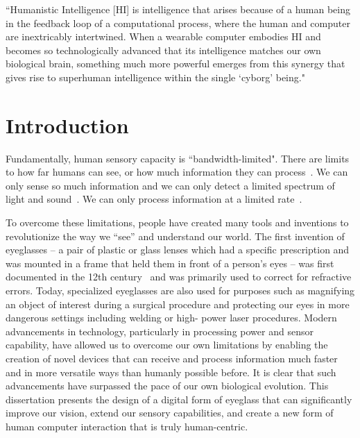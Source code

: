 \begin{savequote}[65mm]
``Humanistic Intelligence [HI] is intelligence that arises because of a human being in the feedback 
loop of a computational process, where the human and computer are inextricably intertwined. When a 
wearable computer embodies HI and becomes so technologically advanced that its intelligence 
matches our own biological brain, something much more powerful emerges from this synergy that 
gives rise to superhuman intelligence within the single `cyborg' being."
\end{savequote}

\chapter{Introduction}
Fundamentally, human sensory capacity is ``bandwidth-limited". There are limits to how far humans can see, or how much information they can process~\cite{ophthalmology3rd}. We can only sense so much information and we can only detect a limited spectrum of light and sound~\cite{laming1986weber}. We can only process information at a limited rate~\cite{martin2009thermodynamics}.

To overcome these limitations, people have created many tools and 
inventions to revolutionize the way we ``see'' and understand our world. The first invention of 
eyeglasses -- a pair of plastic or glass lenses which had a specific prescription and was 
mounted in a frame that held them in front of a person's eyes -- was first documented in the 12th 
century~\cite{rosen1956invention} and was primarily used to correct for refractive errors. Today, 
specialized eyeglasses are also used for purposes such as magnifying an object of interest during a 
surgical procedure and protecting our eyes in more dangerous settings including welding or high-
power laser procedures. Modern advancements in technology, particularly in processing power and 
sensor capability, have allowed us to overcome our own limitations by enabling the creation of novel 
devices that can receive and process information much faster and in more versatile ways than humanly possible before. 
It is clear that such advancements have surpassed the pace of our own biological evolution. This 
dissertation presents the design of a digital form of eyeglass that can significantly improve our 
vision, extend our sensory capabilities, and create a new form of human computer interaction that is 
truly human-centric. 

